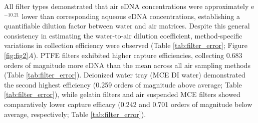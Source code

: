 \documentclass{article}
\begin{document}
All filter types demonstrated that air eDNA concentrations were approximately e$^{-10.21}$ lower than corresponding aqueous eDNA concentrations, establishing a quantifiable dilution factor between water and air matrices. Despite this general consistency in estimating the water-to-air dilution coefficient, method-specific variations in collection efficiency were observed (Table \ref{tab:filter_error}; Figure \ref{fig:fig2}\textit{A}). PTFE filters exhibited higher capture efficiencies, collecting 0.683 orders of magnitude more eDNA than the mean across all air sampling methods (Table \ref{tab:filter_error}). Deionized water tray (MCE DI water) demonstrated the second highest efficiency (0.259 orders of magnitude above average; Table \ref{tab:filter_error}), while gelatin filters and air suspended MCE filters showed comparatively lower capture efficacy (0.242 and 0.701 orders of magnitude below average, respectively; Table \ref{tab:filter_error}).
\end{document}
